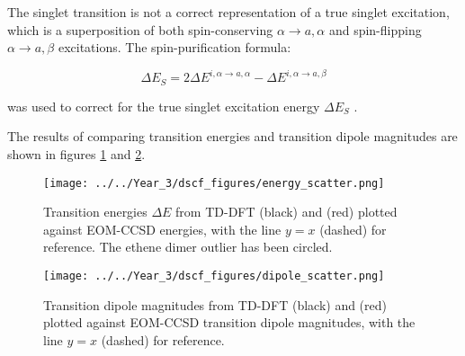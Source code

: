 The \dscf singlet transition is not a correct representation of a 
true singlet excitation, which is a superposition of both spin-conserving
 $\alpha \rightarrow a, \alpha$ and spin-flipping $\alpha \rightarrow a, \beta$
excitations. The spin-purification formula:

\begin{equation}
\Delta E_S = 2\Delta E^{i,\alpha \rightarrow a, \alpha} - \Delta E^{i,\alpha \rightarrow a, \beta}
\end{equation}

was used to correct for the true singlet excitation energy $\Delta E_S$ \cite{Ziegler1977}.

The results of comparing transition energies and transition dipole magnitudes are
shown in figures \ref{fig:energy_scatter} and \ref{fig:dipole_scatter}.

\begin{figure}
\centering
\texttt{[image: ../../Year\_3/dscf\_figures/energy\_scatter.png]}
\caption{Transition energies $\Delta E$ from TD-DFT (black) and \dscf (red)
 plotted against EOM-CCSD energies, with the line $y=x$ (dashed) for reference.
 The ethene dimer outlier has been circled.}
\label{fig:energy_scatter}
\end{figure}

\begin{figure}
\centering
\texttt{[image: ../../Year\_3/dscf\_figures/dipole\_scatter.png]}
\caption{Transition dipole magnitudes from TD-DFT (black) and \dscf (red) plotted
against EOM-CCSD transition dipole magnitudes, with the line $y=x$ (dashed) for 
reference.}
\label{fig:dipole_scatter}
\end{figure}

